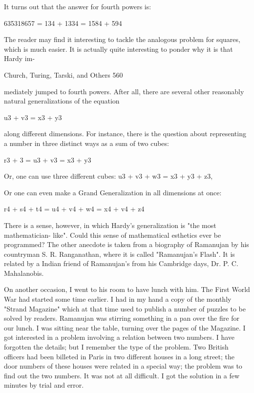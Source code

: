 {It turns out that the answer for fourth powers is:

                          635318657 = 134 + 1334 = 1584 + 594

The reader may find it interesting to tackle the analogous problem for squares, which is
much easier.
       It is actually quite interesting to ponder why it is that Hardy im-




Church, Turing, Tarski, and Others                                                      560

mediately jumped to fourth powers. After all, there are several other reasonably natural
generalizations of the equation

                                         u3 + v3 = x3 + y3

along different dimensions. For instance, there is the question about representing a
number in three distinct ways as a sum of two cubes:

                                  r3 + 3 = u3 + v3 = x3 + y3

Or, one can use three different cubes:
                                 u3
                                      + v3 + w3 = x3 + y3 + z3,

Or one can even make a Grand Generalization in all dimensions at once:

                          r4 + s4 + t4 = u4 + v4 + w4 = x4 + v4 + z4

There is a sense, however, in which Hardy's generalization is "the most mathematician-
like". Could this sense of mathematical esthetics ever be programmed?
        The other anecdote is taken from a biography of Ramanujan by his
countryman S. R. Ranganathan, where it is called "Ramanujan's Flash". It is related by a
Indian friend of Ramanujan's from his Cambridge days, Dr. P. C. Mahalanobis.

   On another occasion, I went to his room to have lunch with him. The First World
   War had started some time earlier. I had in my hand a copy of the monthly "Strand
   Magazine" which at that time used to publish a number of puzzles to be solved by
   readers. Ramanujan was stirring something in a pan over the fire for our lunch. I
   was sitting near the table, turning over the pages of the Magazine. I got interested in
   a problem involving a relation between two numbers. I have forgotten the details;
   but I remember the type of the problem. Two British officers had been billeted in
   Paris in two different houses in a long street; the door numbers of these houses
   were related in a special way; the problem was to find out the two numbers. It was
   not at all difficult. I got the solution in a few minutes by trial and error.

}
